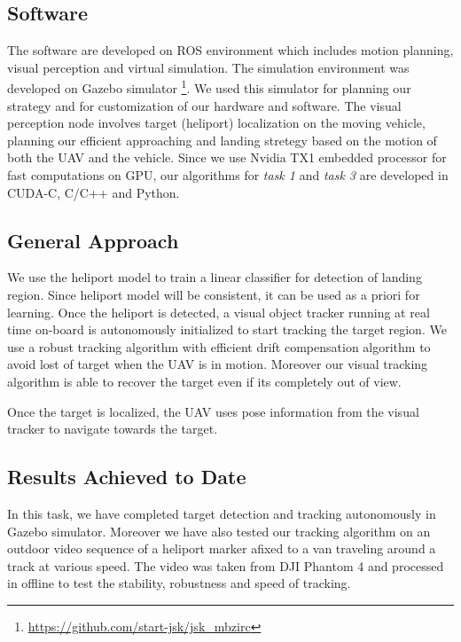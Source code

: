 \documentclass{standalone}
\begin{document}
\subsection{Software}

The software are developed on ROS environment which includes motion planning, visual perception and virtual simulation. The simulation environment was developed on Gazebo simulator \footnote{\url{https://github.com/start-jsk/jsk_mbzirc}}. We used this simulator for planning our strategy and for customization of our hardware and software. The visual perception node involves target (heliport) localization on the moving vehicle, planning our efficient approaching and landing stretegy based on the motion of both the UAV and the vehicle. Since we use Nvidia TX1 embedded processor for fast computations on GPU, our algorithms for \textit{task 1} and \textit{task 3} are developed in CUDA-C, C/C++ and Python. 



\subsection{General Approach}

We use the heliport model to train a linear classifier for detection of landing region. Since heliport model will be consistent, it can be used as a priori for learning. Once the heliport is detected, a visual object tracker running at real time on-board is autonomously initialized to start tracking the target region. We use a robust tracking algorithm with efficient drift compensation algorithm to avoid lost of target when the UAV is in motion. Moreover our visual tracking algorithm is able to recover the target even if its completely out of view. 

Once the target is localized, the UAV uses pose information from the visual tracker to navigate towards the target. 


\subsection{Results Achieved to Date}
In this task, we have completed target detection and tracking autonomously in Gazebo simulator. 
Moreover we have also tested our tracking algorithm on an outdoor video sequence of a heliport marker afixed to a van traveling around a track at various speed. The video was taken from DJI Phantom 4 and processed in offline to test the stability, robustness and speed of tracking.
\end{document}
